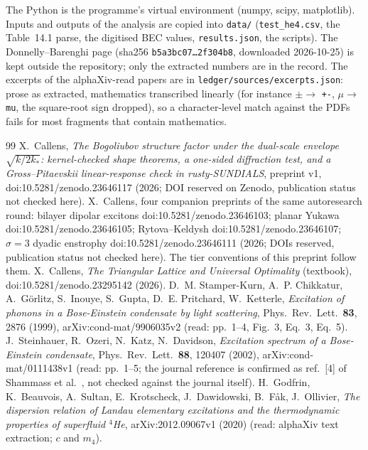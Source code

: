 \documentclass[11pt]{article}
\theoremstyle{remark}
\begin{document}
The Python is the programme's virtual environment (numpy, scipy, matplotlib). Inputs and outputs of the analysis are copied into \texttt{data/} (\texttt{test\_he4.csv}, the Table~14.1 parse, the digitised BEC values, \texttt{results.json}, the scripts). The Donnelly--Barenghi page (sha256 \texttt{b5a3bc07\ldots 2f304b8}, downloaded 2026-10-25) is kept outside the repository; only the extracted numbers
are in the record. The excerpts of the alphaXiv-read papers are in \texttt{ledger/sources/excerpts.json}: prose as extracted, mathematics transcribed linearly (for instance $\pm\to$ \texttt{+-}, $\mu\to$ \texttt{mu}, the square-root sign dropped), so a character-level match against the PDFs fails for most fragments that contain mathematics.

\begin{thebibliography}{99}\small
{} X.~Callens, \emph{The Bogoliubov structure factor under the dual-scale envelope $\sqrt{k/2k_*}$: kernel-checked shape theorems, a one-sided diffraction test, and a Gross--Pitaevskii linear-response check in rusty-SUNDIALS}, preprint v1, doi:10.5281/zenodo.23646117 (2026; DOI reserved on Zenodo, publication status not checked here).
 X.~Callens, four companion preprints of the same autoresearch round: bilayer dipolar excitons doi:10.5281/zenodo.23646103; planar Yukawa doi:10.5281/zenodo.23646105; Rytova--Keldysh doi:10.5281/zenodo.23646107; $\sigma=3$ dyadic enstrophy doi:10.5281/zenodo.23646111 (2026; DOIs reserved, publication status not checked here). The tier conventions of this preprint follow them.
 X.~Callens, \emph{The Triangular Lattice and Universal Optimality} (textbook), doi:10.5281/zenodo.23295142 (2026).
 D.~M. Stamper-Kurn, A.~P. Chikkatur, A.~G\"orlitz, S.~Inouye, S.~Gupta, D.~E. Pritchard, W.~Ketterle, \emph{Excitation of phonons in a Bose-Einstein condensate by light scattering}, Phys.\ Rev.\ Lett.\ \textbf{83}, 2876 (1999), arXiv:cond-mat/9906035v2 (read: pp.~1--4, Fig.~3, Eq.~3, Eq.~5).
 J.~Steinhauer, R.~Ozeri, N.~Katz, N.~Davidson, \emph{Excitation spectrum of a Bose-Einstein condensate}, Phys.\ Rev.\ Lett.\ \textbf{88}, 120407 (2002), arXiv:cond-mat/0111438v1 (read: pp.~1--5; the journal reference is confirmed as ref.~[4] of Shammass et al.~\cite{sham}, not checked against the journal itself).
 H.~Godfrin, K.~Beauvois, A.~Sultan, E.~Krotscheck, J.~Dawidowski, B.~F{\aa}k, J.~Ollivier, \emph{The dispersion relation of Landau elementary excitations and the thermodynamic properties of superfluid $^4$He}, arXiv:2012.09067v1 (2020) (read: alphaXiv text extraction; $c$ and $m_4$).

\end{thebibliography}
\end{document}
